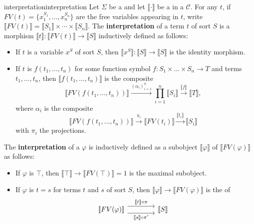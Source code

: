 \begin{topic}{interpretation}{interpretation}
    Let $\Sigma$ be a  and let $\llbracket \cdot \rrbracket$ be a  in a  $\mathcal{C}$.
    For any  $t$, if $FV(t) = \{ x_1^{S_1}, \ldots, x_n^{S_n} \}$ are the free variables appearing in $t$, write $\llbracket FV(t) \rrbracket = \llbracket S_1 \rrbracket \times \cdots \times \llbracket S_n \rrbracket$.
    The \textbf{interpretation} of a term $t$ of sort $S$ is a morphism $\llbracket t \rrbracket \colon \llbracket FV(t) \rrbracket \to \llbracket S \rrbracket$ inductively defined as follows:
    \begin{itemize}
        \item If $t$ is a variable $x^S$ of sort $S$, then $\llbracket x^S \rrbracket \colon \llbracket S \rrbracket \to \llbracket S \rrbracket$ is the identity morphism.
        \item If $t$ is $f(t_1, \ldots, t_n)$ for some function symbol $f \colon S_1 \times \ldots \times S_n \to T$ and terms $t_1, \ldots, t_n$, then $\llbracket f(t_1, \ldots, t_n) \rrbracket$ is the composite
        \[ \llbracket FV(f(t_1, \ldots, t_n)) \rrbracket \xrightarrow{(\alpha_i)_{i = 1}^{n}} \prod_{i = 1}^{n} \llbracket S_i \rrbracket \xrightarrow{\llbracket f \rrbracket} \llbracket T \rrbracket , \]
        where $\alpha_i$ is the composite
        \[ \llbracket FV(f(t_1, \ldots, t_n)) \rrbracket \xrightarrow{\pi_i} \llbracket FV(t_i) \rrbracket \xrightarrow{\llbracket t_i \rrbracket} \llbracket S_i \rrbracket \]
        with $\pi_i$ the projections.
    \end{itemize}
    The \textbf{interpretation} of a  $\varphi$ is inductively defined as a subobject $\llbracket \varphi \rrbracket$ of $\llbracket FV(\varphi) \rrbracket$ as follows:
    \begin{itemize}
        \item If $\varphi$ is $\top$, then $\llbracket \top \rrbracket \to \llbracket FV(\top) \rrbracket = 1$ is the maximal subobject.
        \item If $\varphi$ is $t = s$ for terms $t$ and $s$ of sort $S$, then $\llbracket \varphi \rrbracket \to \llbracket FV(\varphi) \rrbracket$ is the  of
        \[ \svg \begin{tikzcd}[column sep=4em]
            \llbracket FV(\varphi) \rrbracket \arrow[shift left=0.5em]{r}{\llbracket t \rrbracket \circ \pi} \arrow[shift right=0.5em, swap]{r}{\llbracket s \rrbracket \circ \pi'} & \llbracket S \rrbracket

\end{tikzcd}\]
\end{itemize}
\end{topic}
